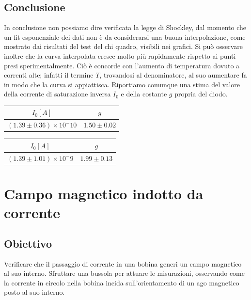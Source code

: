 \documentclass[a4paper]{article}
\begin{document}
\subsection{Conclusione}
In conclusione non possiamo dire verificata la legge di Shockley, dal momento che un fit esponenziale dei dati non è da considerarsi una buona interpolazione, come mostrato dai risultati del test del chi quadro, visibili nei grafici. Si può osservare inoltre che la curva interpolata cresce molto più rapidamente rispetto ai punti presi sperimentalmente. Ciò è concorde con l'aumento di temperatura dovuto a correnti alte; infatti il termine $T$, trovandosi al denominatore, al suo aumentare fa in modo che la curva si appiattisca. 
Riportiamo comunque una stima del valore della corrente di saturazione inversa $I_0$ e della costante $g$ propria del diodo. 
\begin{center}
\begin{tabular}{|c|c|}
\hline
$I_0[A]$ & $g$ \\
\hline
$(1.39 \pm 0.36)\times10^-10 $ & $1.50 \pm 0.02$ \\
\hline
\end{tabular}
\end{center}
\begin{center}
\begin{tabular}{|c|c|}
\hline
$I_0 [A]$ & $g$ \\
\hline
$(1.39 \pm 1.01)\times10^-9 $ & $1.99 \pm 0.13$ \\
\hline
\end{tabular}
\end{center}



\section{Campo magnetico indotto da corrente}
\subsection{Obiettivo}
Verificare che il passaggio di corrente in una bobina generi un campo magnetico al suo interno.
Sfruttare una bussola per attuare le misurazioni, osservando come la corrente in circolo nella bobina incida sull'orientamento di un ago magnetico posto al suo interno.
\end{document}
